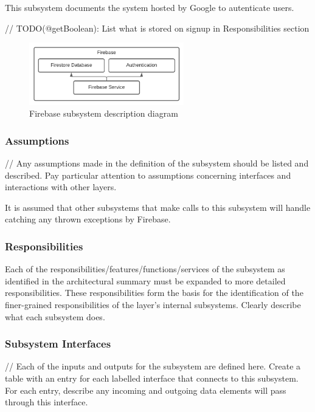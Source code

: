 This subsystem documents the system hosted by Google to autenticate users.

// TODO(@getBoolean): List what is stored on signup in Responsibilities section

\begin{figure}[h!]
    \centering
    \includegraphics[width=0.60\textwidth]{images/ADS_Diagram_Firebase}
    \caption{Firebase subsystem description diagram}
\end{figure}

\subsubsection{Assumptions}
// Any assumptions made in the definition of the subsystem should be listed and described. Pay particular attention to assumptions concerning interfaces and interactions with other layers.

It is assumed that other subsystems that make calls to this subsystem will handle catching any thrown exceptions by Firebase.

\subsubsection{Responsibilities}
Each of the responsibilities/features/functions/services of the subsystem as identified in the architectural summary must be expanded to more detailed responsibilities. These responsibilities form the basis for the identification of the finer-grained responsibilities of the layer's internal subsystems. Clearly describe what each subsystem does.

\subsubsection{Subsystem Interfaces}
// Each of the inputs and outputs for the subsystem are defined here. Create a table with an entry for each labelled interface that connects to this subsystem. For each entry, describe any incoming and outgoing data elements will pass through this interface.

